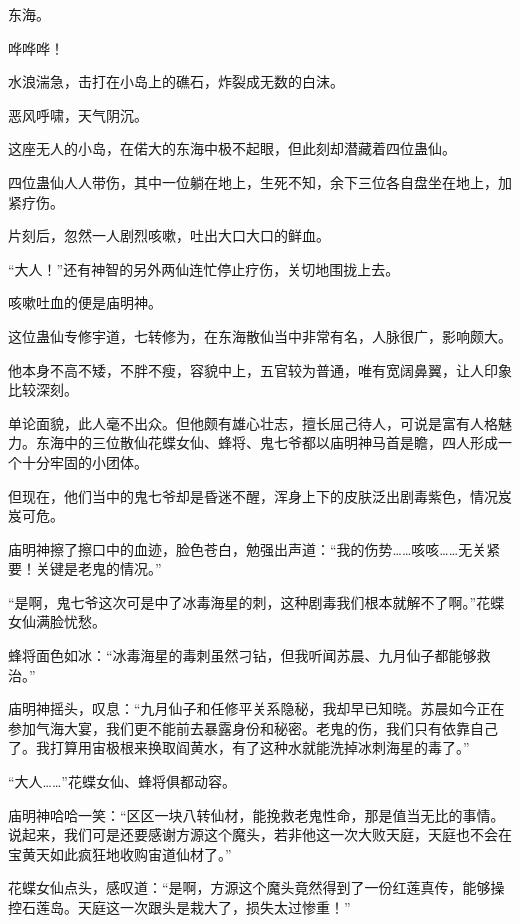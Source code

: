 
\begin{this_body}

东海。

哗哗哗！

水浪湍急，击打在小岛上的礁石，炸裂成无数的白沫。

恶风呼啸，天气阴沉。

这座无人的小岛，在偌大的东海中极不起眼，但此刻却潜藏着四位蛊仙。

四位蛊仙人人带伤，其中一位躺在地上，生死不知，余下三位各自盘坐在地上，加紧疗伤。

片刻后，忽然一人剧烈咳嗽，吐出大口大口的鲜血。

“大人！”还有神智的另外两仙连忙停止疗伤，关切地围拢上去。

咳嗽吐血的便是庙明神。

这位蛊仙专修宇道，七转修为，在东海散仙当中非常有名，人脉很广，影响颇大。

他本身不高不矮，不胖不瘦，容貌中上，五官较为普通，唯有宽阔鼻翼，让人印象比较深刻。

单论面貌，此人毫不出众。但他颇有雄心壮志，擅长屈己待人，可说是富有人格魅力。东海中的三位散仙花蝶女仙、蜂将、鬼七爷都以庙明神马首是瞻，四人形成一个十分牢固的小团体。

但现在，他们当中的鬼七爷却是昏迷不醒，浑身上下的皮肤泛出剧毒紫色，情况岌岌可危。

庙明神擦了擦口中的血迹，脸色苍白，勉强出声道：“我的伤势……咳咳……无关紧要！关键是老鬼的情况。”

“是啊，鬼七爷这次可是中了冰毒海星的刺，这种剧毒我们根本就解不了啊。”花蝶女仙满脸忧愁。

蜂将面色如冰：“冰毒海星的毒刺虽然刁钻，但我听闻苏晨、九月仙子都能够救治。”

庙明神摇头，叹息：“九月仙子和任修平关系隐秘，我却早已知晓。苏晨如今正在参加气海大宴，我们更不能前去暴露身份和秘密。老鬼的伤，我们只有依靠自己了。我打算用宙极根来换取阎黄水，有了这种水就能洗掉冰刺海星的毒了。”

“大人……”花蝶女仙、蜂将俱都动容。

庙明神哈哈一笑：“区区一块八转仙材，能挽救老鬼性命，那是值当无比的事情。说起来，我们可是还要感谢方源这个魔头，若非他这一次大败天庭，天庭也不会在宝黄天如此疯狂地收购宙道仙材了。”

花蝶女仙点头，感叹道：“是啊，方源这个魔头竟然得到了一份红莲真传，能够操控石莲岛。天庭这一次跟头是栽大了，损失太过惨重！”


\end{this_body}
